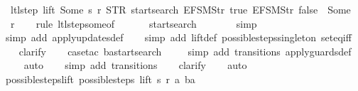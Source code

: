 \begin{isabellebody}
\ \ ltl{\isacharunderscore}step\ lift\ {\isacharparenleft}Some\ s{\isacharparenright}\ r\ {\isacharparenleft}STR\ {\isacharprime}{\isacharprime}startsearch{\isacharprime}{\isacharprime}{\isacharcomma}\ {\isacharbrackleft}EFSM{\isachardot}Str\ {\isacharprime}{\isacharprime}true{\isacharprime}{\isacharprime}{\isacharcomma}\ EFSM{\isachardot}Str\ {\isacharprime}{\isacharprime}false{\isacharprime}{\isacharprime}{\isacharbrackright}{\isacharparenright}\ {\isacharequal}\ {\isacharparenleft}Some\ {}{\isacharcomma}\ {\isacharbrackleft}{\isacharbrackright}{\isacharcomma}\ r{\isacharparenright}{\isachardoublequoteclose}\isanewline
%
\isadelimproof
\ \ %
\endisadelimproof
%
\isatagproof
{}\isamarkupfalse%
\ {\isacharparenleft}rule\ ltl{\isacharunderscore}step{\isacharunderscore}some{\isacharbrackleft}of\ {\isacharunderscore}\ {\isacharunderscore}\ {\isacharunderscore}\ {\isacharunderscore}\ {\isacharunderscore}\ {}\ startsearch{\isacharbrackright}{\isacharparenright}\isanewline
\ \ \ \ \isamarkupfalse%
\ \isamarkupfalse%
\ simp\isanewline
\ \ \ \isamarkupfalse%
\ {\isacharparenleft}simp\ add{\isacharcolon}\ apply{\isacharunderscore}updates{\isacharunderscore}def{\isacharparenright}\isanewline
\ \ \isamarkupfalse%
\ {\isacharparenleft}simp\ add{\isacharcolon}\ lift{\isacharunderscore}def\ possible{\isacharunderscore}steps{\isacharunderscore}singleton\ set{\isacharunderscore}eq{\isacharunderscore}iff{\isacharparenright}\isanewline
\ \ \isamarkupfalse%
\ clarify\isanewline
\ \ \isamarkupfalse%
\ {\isacharparenleft}case{\isacharunderscore}tac\ {\isachardoublequoteopen}ba{\isacharequal}startsearch{\isachardoublequoteclose}{\isacharparenright}\isanewline
\ \ \ \isamarkupfalse%
\ {\isacharparenleft}simp\ add{\isacharcolon}\ transitions\ apply{\isacharunderscore}guards{\isacharunderscore}def{\isacharparenright}\isanewline
\ \ \ \isamarkupfalse%
\ auto{\isacharbrackleft}{}{\isacharbrackright}\isanewline
\ \ \isamarkupfalse%
\ {\isacharparenleft}simp\ add{\isacharcolon}\ transitions{\isacharparenright}\isanewline
\ \ \isamarkupfalse%
\ clarify\isanewline
\ \ \isamarkupfalse%
\ auto%
\endisatagproof
{\isafoldproof}%
%
\isadelimproof
\isanewline
%
\endisadelimproof
\isanewline
{}\isamarkupfalse%
\ possible{\isacharunderscore}steps{\isacharunderscore}lift{\isacharcolon}\ {\isachardoublequoteopen}possible{\isacharunderscore}steps\ lift\ s\ r\ a\ ba\ {\isasymnoteq}\ {\isacharbraceleft}{\isacharbar}{\isacharbar}{\isacharbraceright}\ {\isasymLongrightarrow}\isanewline

\end{isabellebody}
